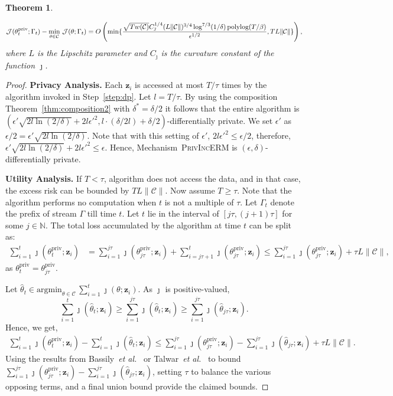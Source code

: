 \documentclass{article}
\theoremstyle{plain}
\newenvironment{CompactEnumerate}{
\addtolength{\textheight}{.8in}
\addtolength{\textwidth}{.8in}
\addtolength{\oddsidemargin}{-.4in}
\addtolength{\evensidemargin}{-.4in}
\addtolength{\topmargin}{-.2in}

\begin{list}{\arabic{enumi}.}{%
\usecounter{enumi}
\setlength{\leftmargin}{12pt}
\setlength{\itemindent}{3pt}
\setlength{\topsep}{3pt}
\setlength{\itemsep}{1pt}
}}
{\end{list}}
\newtheorem{theorem}{Theorem}[section]
\def \PrivIncERM {\textsc{PrivIncERM}\xspace}
\def \polylog{\mbox{\rm polylog}}
\def \eps {\epsilon}
\def \z {\mathbf z}
\def \CCC {\mathcal{C}}
\def \JJJ {\mathcal{J}}
\def \N {\mathbb N}
\def \priv {{\mathrm{priv}}}
\def \N {\mathbb{N}}
\begin{document}
\begin{theorem}
\begin{CompactEnumerate}
\begin{align*}
\JJJ(\theta^\priv_t; \Gamma_t) - \min_{\theta \in \CCC}\, \JJJ(\theta; \Gamma_t) = O \left (\min \{ \frac{\sqrt{Tw(\CCC)}C_\jmath^{1/4} (L \| \CCC \|)^{3/4} \log^{7/3}(1/\delta) \, \polylog(T/\beta)}{\eps^{1/2}}, T L \| \CCC \| \} \right ),
\end{align*}
where $L$ is the Lipschitz parameter and $C_\jmath$ is the curvature constant of the function $\jmath$.
\end{CompactEnumerate}
\end{theorem}
\begin{proof}
\noindent\textbf{Privacy Analysis.} Each $\z_i$ is accessed at most $T/\tau$ times by the algorithm invoked in Step~\ref{step:dp}. Let $l=T/\tau$. By using the composition Theorem~\ref{thm:composition2} with $\delta^\ast = \delta/2$ it follows that the entire algorithm is $(\eps'\sqrt{2l\ln(2/\delta)}+2l\eps'^2,l\cdot(\delta/2l)+\delta/2)$-differentially private. We set $\eps'$ as $\eps/2 = \eps'\sqrt{2l\ln(2/\delta)}$. Note that with this setting of $\eps'$, $2l\eps'^2 \leq \eps/2$, therefore, $\eps'\sqrt{2l\ln(2/\delta)}+2l\eps'^2 \leq \eps$. Hence, Mechanism~\PrivIncERM is $(\eps,\delta)$-differentially private.


\noindent\textbf{Utility Analysis.} If $T < \tau$, algorithm does not access the data, and in that case, the excess risk can be bounded by $ TL \| \CCC \|$. Now assume $T\geq \tau$. Note that the algorithm performs no computation when $t$ is not a multiple of $\tau$. Let $\Gamma_t$ denote the prefix of stream $\Gamma$ till time $t$. Let $t$ lie in the interval of $[j\tau,(j+1)\tau]$ for some $j \in \N$. The total loss accumulated by the algorithm at time $t$ can be split as:
\begin{align*}
\sum_{i=1}^t \jmath(\theta^\priv_t;\z_i) & = \sum_{i=1}^{j\tau} \jmath(\theta^\priv_{j\tau};\z_i) + \sum_{i=j\tau+1}^t \jmath(\theta^\priv_{j\tau};\z_i) \leq \sum_{i=1}^{j\tau}  \jmath(\theta^\priv_{j\tau};\z_i) + \tau L \| \CCC\|,
\end{align*}
as $\theta^\priv_t = \theta^\priv_{j \tau}$. 

Let $\hat{\theta}_t \in \mbox{argmin}_{\theta \in \CCC}\, \sum_{i=1}^t \jmath(\theta;\z_i)$. As $\jmath$ is positive-valued,
$$\sum_{i=1}^t \jmath(\hat{\theta}_t;\z_i) \geq \sum_{i=1}^{j\tau} \jmath(\hat{\theta}_t;\z_i) \geq \sum_{i=1}^{j\tau} \jmath(\hat{\theta}_{j \tau};\z_i).$$
Hence, we get,
\begin{align*}
\sum_{i=1}^t \jmath(\theta^\priv_t;\z_i) - \sum_{i=1}^t \jmath(\hat{\theta}_t;\z_i)  \leq \sum_{i=1}^{j\tau} \jmath(\theta^\priv_{j\tau};\z_i) - \sum_{i=1}^{j\tau}\jmath(\hat{\theta}_{j \tau};\z_i) + \tau L \| \CCC\|.
\end{align*}
Using the results from Bassily~\emph{et al.}\ \cite{bassily2014differentially} or Talwar~\emph{et al.}\ \cite{talwar2015nearly} to bound $\sum_{i=1}^{j \tau} \jmath(\theta^\priv_{j\tau};\z_i)  - \sum_{i=1}^{j \tau} \jmath(\hat{\theta}_{j \tau};\z_i)$, setting $\tau$ to balance the various opposing terms, and a final union bound provide the claimed bounds.
\end{proof}
\end{document}
